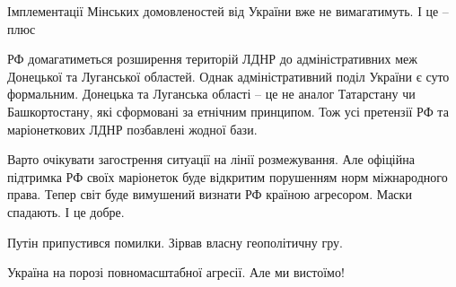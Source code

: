 \begin{zznagolos}
Імплементації Мінських домовленостей від України вже не вимагатимуть. І це – плюс
\end{zznagolos}

РФ домагатиметься розширення територій ЛДНР до адміністративних меж Донецької
та Луганської областей. Однак адміністративний поділ України є суто формальним.
Донецька та Луганська області – це не аналог Татарстану чи Башкортостану, які
сформовані за етнічним принципом. Тож усі претензії РФ та маріонеткових ЛДНР
позбавлені жодної бази.

Варто очікувати загострення ситуації на лінії розмежування. Але офіційна
підтримка РФ своїх маріонеток буде відкритим порушенням норм міжнародного
права. Тепер світ буде вимушений визнати РФ країною агресором. Маски спадають.
І це добре.

Путін припустився помилки. Зірвав власну геополітичну гру.

Україна на порозі повномасштабної агресії. Але ми вистоїмо!
